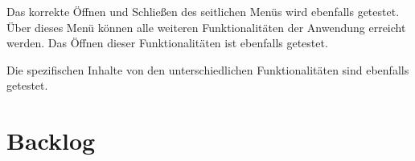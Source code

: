 \documentclass[a4paper]{article}
\begin{document}
		Das korrekte Öffnen und Schließen des seitlichen Menüs wird ebenfalls getestet. Über dieses Menü können alle weiteren Funktionalitäten der Anwendung erreicht werden. Das Öffnen dieser Funktionalitäten ist ebenfalls getestet.
		
		Die spezifischen Inhalte von den unterschiedlichen Funktionalitäten sind ebenfalls getestet.
	\section{Backlog}
\end{document}
